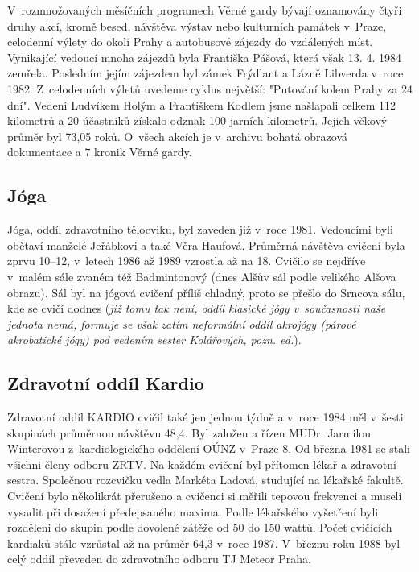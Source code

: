 \documentclass[a5paper, 12pt, twoside]{article}
\begin{document}
V~rozmnožovaných měsíčních programech Věrné gardy bývají oznamovány
čtyři druhy akcí, kromě besed, návštěva výstav nebo kulturních památek
v~Praze, celodenní výlety do okolí Prahy a autobusové zájezdy do
vzdálených míst. Vynikající vedoucí mnoha zájezdů byla Františka Pášová,
která však 13. 4. 1984 zemřela. Posledním jejím zájezdem byl zámek
Frýdlant a Lázně Libverda v~roce 1982. Z~celodenních výletů uvedeme
cyklus největší: "Putování kolem Prahy za 24 dní". Vedeni Ludvíkem
Holým a Františkem Kodlem jsme našlapali celkem 112 kilometrů a 20
účastníků získalo odznak 100 jarních kilometrů. Jejich věkový průměr byl
73,05 roků. O~všech akcích je v~archivu bohatá obrazová dokumentace a 7
kronik Věrné gardy.

\subsection{Jóga}

Jóga, oddíl zdravotního tělocviku, byl zaveden již v~roce 1981.
Vedoucími byli obětaví manželé Jeřábkovi a také Věra Haufová. Průměrná
návštěva cvičení byla zprvu 10--12, v~letech 1986 až 1989 vzrostla až na
18. Cvičilo se nejdříve v~malém sále zvaném též Badmintonový (dnes Alšův
sál podle velikého Alšova obrazu). Sál byl na jógová cvičení příliš
chladný, proto se přešlo do Srncova sálu, kde se cvičí dodnes (\textit{již
tomu tak není, oddíl klasické jógy v~současnosti naše jednota nemá,
formuje se však zatím neformální oddíl akrojógy (párové akrobatické
jógy) pod vedením sester Kolářových, pozn. ed.}).

\subsection{Zdravotní oddíl Kardio}

Zdravotní oddíl KARDIO cvičil také jen jednou týdně a v~roce 1984 měl
v~šesti skupinách průměrnou návštěvu 48,4. Byl založen a řízen MUDr.
Jarmilou Winterovou z~kardiologického oddělení OÚNZ v~Praze 8. Od března
1981 se stali všichni členy odboru ZRTV. Na každém cvičení byl přítomen
lékař a zdravotní sestra. Společnou rozcvičku vedla Markéta Ladová,
studující na lékařské fakultě. Cvičení bylo několikrát přerušeno a
cvičenci si měřili tepovou frekvenci a museli vysadit při dosažení
předepsaného maxima. Podle lékařského vyšetření byli rozděleni do skupin
podle dovolené zátěže od 50 do 150 wattů. Počet cvičících kardiaků stále
vzrůstal až na průměr 64,3 v~roce 1987. V~březnu roku 1988 byl celý
oddíl převeden do zdravotního odboru TJ Meteor Praha.
\end{document}
